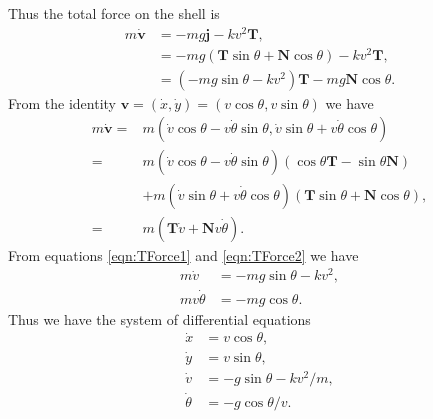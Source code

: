 Thus the total force on the shell is
\begin{align}
m \dot{\mathbf{v}} &= -mg \mathbf{j} - kv^2 \mathbf{T},\nonumber \\
&= -mg( \mathbf{T}\sin{\theta}  + \mathbf{N}\cos{\theta}  ) - kv^2 \mathbf{T},\nonumber\\
&= (-mg \sin{\theta} - k v^2 ) \mathbf{T} - mg \mathbf{N}\cos{\theta} .\label{eqn:TForce1}
\end{align}
From the identity
$\mathbf{v} = ( \dot{x}, \dot{y} ) = ( v \cos{\theta}, v \sin{\theta} )$
we have
\begin{align}
m \dot{\mathbf{v}} = {} & m( \dot{v} \cos{\theta} - v\dot{\theta}\sin{\theta}  ,\dot{v}\sin{\theta} + v\dot{\theta}\cos{\theta} ) \nonumber \\
= {} & m(\dot{v}\cos{\theta} - v\dot{\theta}\sin{\theta} )(\cos{\theta} \mathbf{T} - \sin{\theta}\mathbf{N}) \nonumber \\
& + m(\dot{v} \sin{\theta} + v\dot{\theta}\cos{\theta} )(\mathbf{T} \sin{\theta}  + \mathbf{N}\cos{\theta} ) ,  \nonumber \\
= {} & m(\mathbf{T}\dot{v} + \mathbf{N}v\dot{\theta}) .\label{eqn:TForce2}
%
\end{align}
From equations \eqref{eqn:TForce1} and \eqref{eqn:TForce2} we have
\begin{align*}
m \dot{v} &= -mg\sin{\theta} - k v^2,\\
mv\dot{\theta} &= -mg \cos{\theta}.
\end{align*}
Thus we have the system of differential equations
\begin{align}
\dot{x} &= v\cos{\theta}, \nonumber \\
\dot{y} &= v\sin{\theta},\nonumber \\
\dot{v} &= -g\sin{\theta} -  k v^2/m,\nonumber \\
\dot{\theta} &= -g \cos{\theta}/v. \nonumber
\end{align}


